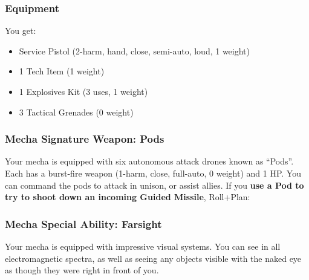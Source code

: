 
\subsubsection{Equipment}
You get:
\begin{itemize}
\item Service Pistol (2-harm, hand, close, semi-auto, loud, 1 weight) 
\item 1 Tech Item (1 weight)
\item 1 Explosives Kit (3 uses, 1 weight)
\item 3 Tactical Grenades (0 weight)
\end{itemize}

\subsubsection{Mecha Signature Weapon: Pods}
Your mecha is equipped with six autonomous attack drones known as ``Pods''. Each has a burst-fire weapon (1-harm, close, full-auto, 0 weight) and 1 HP. You can command the pods to attack in unison, or assist allies. If you \textbf{use a Pod to try to shoot down an incoming Guided Missile}, Roll+Plan:

\subsubsection{Mecha Special Ability: Farsight}
Your mecha is equipped with impressive visual systems. You can see in all electromagnetic spectra, as well as seeing any objects visible with the naked eye as though they were right in front of you.
